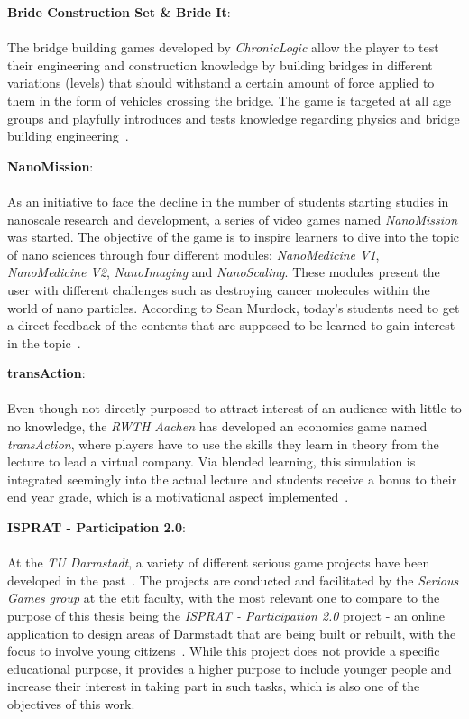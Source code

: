 \textbf{Bride Construction Set \& Bride It}:\\ \\
The bridge building games developed by \textit{ChronicLogic} allow the player to test their engineering and
construction knowledge by building bridges in different variations (levels) that should withstand a certain amount
of force applied to them in the form of vehicles crossing the bridge.
The game is targeted at all age groups and playfully introduces and tests knowledge regarding physics and bridge
building engineering~\cite{Bridebuilder}.

\textbf{NanoMission}:\\ \\
As an initiative to face the decline in the number of students starting studies in nanoscale research and development,
a series of video games named \textit{NanoMission} was started.
The objective of the game is to inspire learners to dive into the topic of nano sciences through four different modules:
\textit{NanoMedicine V1}, \textit{NanoMedicine V2}, \textit{NanoImaging} and \textit{NanoScaling}.
These modules present the user with different challenges such as destroying cancer molecules within the world of
nano particles.
According to Sean Murdock, today's students need to get a direct feedback of the contents that are supposed
to be learned to gain interest in the topic~\cite{nanomission}.

\textbf{transAction}:\\ \\
Even though not directly purposed to attract interest of an audience with little to no knowledge, the \textit{RWTH Aachen}
has developed an economics game named \textit{transAction}, where players have to use the skills they learn in theory from
the lecture to lead a virtual company.
Via blended learning, this simulation is integrated seemingly into the actual lecture and students receive a bonus to
their end year grade, which is a motivational aspect implemented~\cite{rwth-aachen:transaction}.

\textbf{ISPRAT - Participation 2.0}:\\ \\
At the \textit{TU Darmstadt}, a variety of different serious game projects have been developed in the past~\cite{tu-darm:projectslist}.
The projects are conducted and facilitated by the \textit{Serious Games group} at the etit faculty, with the most relevant
one to compare to the purpose of this thesis being the \textit{ISPRAT - Participation 2.0} project - an online application to design
areas of Darmstadt that are being built or rebuilt, with the focus to involve young citizens~\cite{tu-darm:projectslist, tu-darm:ISPRAT}.
While this project does not provide a specific educational purpose, it provides a higher purpose to include younger people
and increase their interest in taking part in such tasks, which is also one of the objectives of this work.
